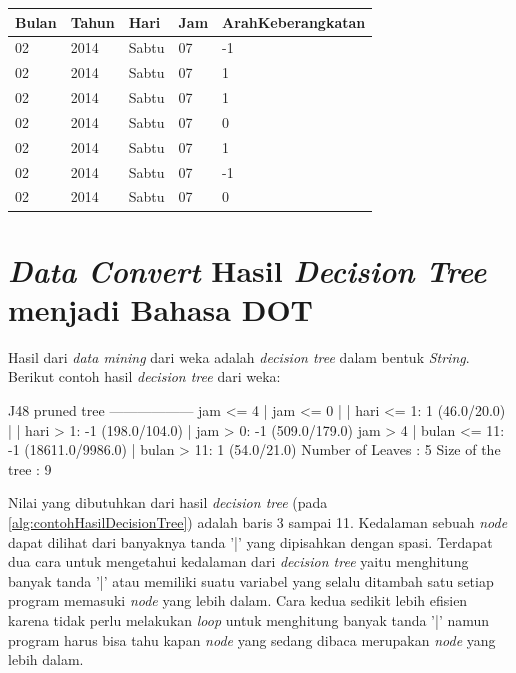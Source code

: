 \begin{table}[H]
\centering
\caption{Contoh hasil data transformasi latitude longitude}
\label{table:contohHasilDataTransformasiLatLong}
\begin{longtable}{|l|l|l|l|l|}
\hline
\textbf{Bulan}	& \textbf{Tahun} 	& \textbf{Hari} & \textbf{Jam}	& \textbf{ArahKeberangkatan} \\ \hline
02								& 2014						& Sabtu         & 07         	& -1                    \\ \hline
02								& 2014						& Sabtu         & 07         	& 1        					  \\ \hline
02								& 2014						& Sabtu         & 07         	& 1       							\\ \hline
02								& 2014						& Sabtu         & 07         	& 0         						\\ \hline
02								& 2014						& Sabtu         & 07         	& 1          					\\ \hline
02								& 2014						& Sabtu         & 07         	& -1      							\\ \hline
02								& 2014						& Sabtu         & 07         	& 0       							\\ \hline
\end{longtable}
\end{table} 

\section{\textsl{Data Convert} Hasil \textsl{Decision Tree} menjadi Bahasa DOT}

Hasil dari \textsl{data mining} dari weka adalah \textsl{decision tree} dalam bentuk \textsl{String}. Berikut contoh hasil \textsl{decision tree} dari weka:

\begin{algorithmic}[1]
\label{alg:contohHasilDecisionTree}
	\STATE J48 pruned tree
	\STATE ------------------
	\STATE 
	\STATE jam <= 4
	\STATE |   jam <= 0
	\STATE |   |   hari <= 1: 1 (46.0/20.0)
	\STATE |   |   hari > 1: -1 (198.0/104.0)
	\STATE |   jam > 0: -1 (509.0/179.0)
	\STATE jam > 4
	\STATE |   bulan <= 11: -1 (18611.0/9986.0)
	\STATE |   bulan > 11: 1 (54.0/21.0)
	\STATE 
	\STATE Number of Leaves  : 	5
	\STATE 
	\STATE Size of the tree : 	9
\end{algorithmic}

Nilai yang dibutuhkan dari hasil \textsl{decision tree} (pada \ref{alg:contohHasilDecisionTree}) adalah baris 3 sampai 11. Kedalaman sebuah \textsl{node} dapat dilihat dari banyaknya tanda '|' yang dipisahkan dengan spasi. Terdapat dua cara untuk mengetahui kedalaman dari \textsl{decision tree} yaitu menghitung banyak tanda '|' atau memiliki suatu variabel yang selalu ditambah satu setiap program memasuki \textsl{node} yang lebih dalam. Cara kedua sedikit lebih efisien karena tidak perlu melakukan \textsl{loop} untuk menghitung banyak tanda '|' namun program harus bisa tahu kapan \textsl{node} yang sedang dibaca merupakan \textsl{node} yang lebih dalam. 

